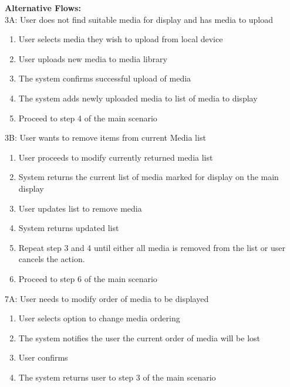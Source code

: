\textbf{Alternative Flows:} \\
3A: User does not find suitable media for display and has media to upload
\begin{enumerate}
    \item User selects media they wish to upload from local device
    \item User uploads new media to media library
    \item The system confirms successful upload of media
    \item The system adds newly uploaded media to list of media to display
    \item Proceed to step 4 of the main scenario
\end{enumerate}
3B: User wants to remove items from current Media list
\begin{enumerate}
    \item User proceeds to modify currently returned media list
    \item System returns the current list of media marked for display on the main display
    \item User updates list to remove media
    \item System returns updated list
    \item Repeat step 3 and 4 until either all media is removed from the list or user cancels the action.
    \item Proceed to step 6 of the main scenario
\end{enumerate}
7A: User needs to modify order of media to be displayed
\begin{enumerate}
    \item User selects option to change media ordering
    \item The system notifies the user the current order of media will be lost
    \item User confirms
    \item The system returns user to step 3 of the main scenario
\end{enumerate}

